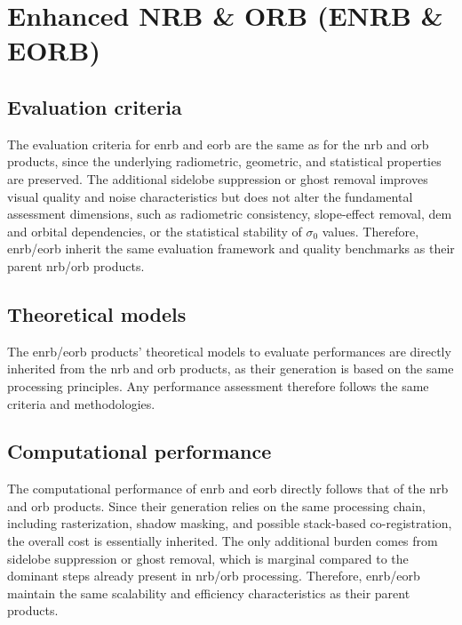 \section{Enhanced NRB \& ORB (ENRB \& EORB)}
\label{sec:enh}

\subsection{Evaluation criteria}
\label{sec:enh_criteria}

The evaluation criteria for \acs{enrb} and \acs{eorb} are the same as for the \acs{nrb} and \acs{orb} products, since the underlying radiometric, geometric, and statistical properties are preserved. The additional sidelobe suppression or ghost removal improves visual quality and noise characteristics but does not alter the fundamental assessment dimensions, such as radiometric consistency, slope-effect removal, \acs{dem} and orbital dependencies, or the statistical stability of $\sigma_0$ values. Therefore, \acs{enrb}/\acs{eorb} inherit the same evaluation framework and quality benchmarks as their parent \acs{nrb}/\acs{orb} products.

\subsection{Theoretical models}
\label{sec:enh_models}

The \acs{enrb}/\acs{eorb} products' theoretical models to evaluate performances are directly inherited from the \acs{nrb} and \acs{orb} products, as their generation is based on the same processing principles. Any performance assessment therefore follows the same criteria and methodologies.

\subsection{Computational performance}
\label{sec:enh_computation}

The computational performance of \acs{enrb} and \acs{eorb} directly follows that of the \acs{nrb} and \acs{orb} products. Since their generation relies on the same processing chain, including rasterization, shadow masking, and possible stack-based co-registration, the overall cost is essentially inherited. The only additional burden comes from sidelobe suppression or ghost removal, which is marginal compared to the dominant steps already present in \acs{nrb}/\acs{orb} processing. Therefore, \acs{enrb}/\acs{eorb} maintain the same scalability and efficiency characteristics as their parent products.

